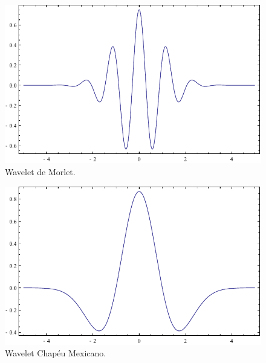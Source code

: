 \begin{frame}[allowframebreaks]
  \begin{figure}[hptb]
  \centering
  \includegraphics[width=.75\textwidth]{images/morlet.pdf}
  \caption{Wavelet de Morlet.}
  \label{fig:morlet}
  \end{figure} 

  \framebreak

  \begin{figure}[hptb]
  \centering
  \includegraphics[width=.75\textwidth]{images/mexicanhat.pdf}
  \caption{Wavelet Chapéu Mexicano.}
  \label{fig:mexicanhat}
  \end{figure} 

\end{frame}

